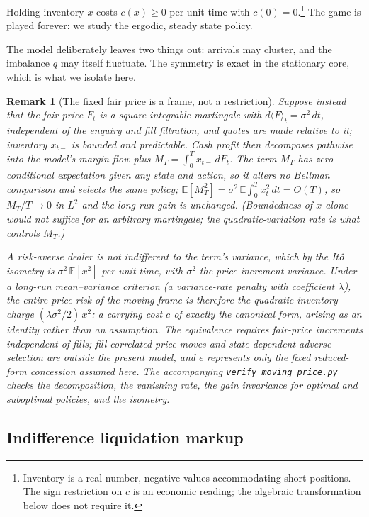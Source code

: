 \documentclass[11pt]{article}
\newtheorem{remark}{Remark}
\begin{document}
Holding inventory $x$ costs $c(x) \ge 0$ per unit time with $c(0) = 0$.\footnote{Inventory is a real number, negative values accommodating short positions. The sign restriction on $c$ is an economic reading; the algebraic transformation below does not require it.} The game is played forever: we study the ergodic, steady state policy.

The model deliberately leaves two things out: arrivals may cluster, and the imbalance $q$ may itself fluctuate. The symmetry is exact in the stationary core, which is what we isolate here.

\begin{remark}[The fixed fair price is a frame, not a restriction]\label{rem:frame}
Suppose instead that the fair price $F_t$ is a square-integrable martingale with $d\langle F\rangle_t = \sigma^2\,dt$, independent of the enquiry and fill filtration, and quotes are made relative to it; inventory $x_{t-}$ is bounded and predictable. Cash profit then decomposes pathwise into the model's margin flow plus $M_T = \int_0^T x_{t-}\,dF_t$. The term $M_T$ has zero conditional expectation given any state and action, so it alters no Bellman comparison and selects the same policy; $\mathbb{E}[M_T^2] = \sigma^2\,\mathbb{E}\int_0^T x_t^2\,dt = O(T)$, so $M_T/T \to 0$ in $L^2$ and the long-run gain is unchanged. (Boundedness of $x$ alone would not suffice for an arbitrary martingale; the quadratic-variation rate is what controls $M_T$.)

A risk-averse dealer is not indifferent to the term's variance, which by the It\^o isometry is $\sigma^{2}\,\mathbb{E}[x^{2}]$ per unit time, with $\sigma^{2}$ the price-increment variance. Under a long-run mean--variance criterion (a variance-rate penalty with coefficient $\lambda$), the entire price risk of the moving frame is therefore the quadratic inventory charge $(\lambda\sigma^{2}/2)\,x^{2}$: a carrying cost $c$ of exactly the canonical form, arising as an identity rather than an assumption. The equivalence requires fair-price increments independent of fills; fill-correlated price moves and state-dependent adverse selection are outside the present model, and $\epsilon$ represents only the fixed reduced-form concession assumed here. The accompanying \texttt{verify\_moving\_price.py} checks the decomposition, the vanishing rate, the gain invariance for optimal and suboptimal policies, and the isometry.
\end{remark}

\subsection{Indifference liquidation markup}\label{sec:nu}
\end{document}
